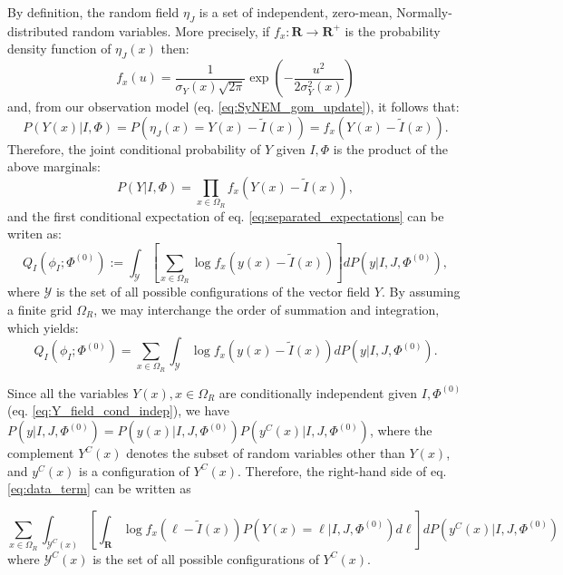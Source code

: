 By definition, the random field $\eta_{J}$ is a set of independent, zero-mean, Normally-distributed random variables. More precisely, if $f_{x}:\mathbf{R}\rightarrow \mathbf{R}^{+}$ is the probability density
function of $\eta_{J}(x)$ then:
\begin{equation}\label{eq:gaussian}
    f_{x}(u) = \frac{1}{\sigma_{Y}(x)\sqrt{2 \pi}}\exp\left(-\frac{u^{2}}{2\sigma^{2}_{Y}(x)}\right)
\end{equation}
and, from our observation model (eq. \eqref{eq:SyNEM_gom_update}), it follows that:
\begin{equation}
    P(Y(x)| I, \Phi) = P(\eta_{J}(x) = Y(x)-\tilde{I}(x)) = f_{x}(Y(x)-\tilde{I}(x)).
\end{equation}
Therefore, the joint conditional probability of $Y$ given $I, \Phi$ is the product of the above marginals:
\begin{equation}\label{eq:Y_field_cond_indep}
    P(Y|I, \Phi) = \prod_{x\in{\Omega_{R}}} f_{x}(Y(x) - \tilde{I}(x)),
\end{equation}
and the first conditional expectation of eq. \eqref{eq:separated_expectations} can be writen as:
\begin{equation}
    Q_{I}(\phi_{I} ; \Phi^{(0)}) := \int_{\mathcal{Y}}\left[\sum_{x\in\Omega_{R}} \log f_{x}\left(y(x) - \tilde{I}(x)\right) \right] dP(y | I, J, \Phi^{(0)}),
\end{equation}
where $\mathcal{Y}$ is the set of all possible configurations of the vector field $Y$. By assuming a finite grid $\Omega_{R}$, we may interchange the order of summation and integration, which yields:
\begin{equation}\label{eq:data_term}
    Q_{I}(\phi_{I} ; \Phi^{(0)}) = \sum_{x\in\Omega_{R}} \int_{\mathcal{Y}} \log f_{x}\left(y(x) - \tilde{I}(x)\right)  dP(y | I, J, \Phi^{(0)}).
\end{equation}

Since all the variables $Y(x), x\in\Omega_{R}$ are conditionally independent given $I, \Phi^{(0)}$ (eq. \eqref{eq:Y_field_cond_indep}), we have $P(y | I, J, \Phi^{(0)}) = P(y(x)| I, J, \Phi^{(0)})P(y^{C}(x) | I, J, \Phi^{(0)})$, where the complement $Y^{C}(x)$
denotes the subset of random variables other than $Y(x)$, and $y^{C}(x)$ is a configuration of $Y^{C}(x)$. Therefore, the right-hand side of eq.\eqref{eq:data_term} can be written as

\begin{equation}\label{eq:split_integral}
    \sum_{x\in\Omega_{R}} \int_{\mathcal{Y}^{C}(x)} \left[\int_{\mathbf{R}} \log f_{x}\left(\ell - \tilde{I}(x)\right) P(Y(x) = \ell | I, J, \Phi^{(0)})d\ell\right]  dP(y^{C}(x) | I, J, \Phi^{(0)})
\end{equation}
where $\mathcal{Y}^{C}(x)$ is the set of all possible configurations of $Y^{C}(x)$.\\

